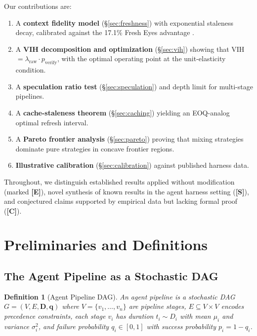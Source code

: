 \documentclass[11pt, a4paper, logo, copyright]{googledeepmind}
\newtheorem{definition}{Definition}[section]
\begin{document}
\noindent Our contributions are:

\begin{enumerate}
    \item A \textbf{context fidelity model} (\S\ref{sec:freshness}) with exponential staleness decay, calibrated against the 17.1\% Fresh Eyes advantage \citep{suzgun2024metaprompting}.
    \item A \textbf{VIH decomposition and optimization} (\S\ref{sec:vih}) showing that VIH $= \lambda_{\mathrm{raw}} \cdot p_{\mathrm{verify}}$, with the optimal operating point at the unit-elasticity condition.
    \item A \textbf{speculation ratio test} (\S\ref{sec:speculation}) and depth limit for multi-stage pipelines.
    \item A \textbf{cache-staleness theorem} (\S\ref{sec:caching}) yielding an EOQ-analog optimal refresh interval.
    \item A \textbf{Pareto frontier analysis} (\S\ref{sec:pareto}) proving that mixing strategies dominate pure strategies in concave frontier regions.
    \item \textbf{Illustrative calibration} (\S\ref{sec:calibration}) against published harness data.
\end{enumerate}

Throughout, we distinguish established results applied without modification (marked \textbf{[E]}), novel synthesis of known results in the agent harness setting (\textbf{[S]}), and conjectured claims supported by empirical data but lacking formal proof (\textbf{[C]}).


\section{Preliminaries and Definitions}\label{sec:prelim}

\subsection{The Agent Pipeline as a Stochastic DAG}

\begin{definition}[Agent Pipeline DAG]\label{def:pipeline}
An agent pipeline is a stochastic DAG $G = (V, E, \mathbf{D}, \mathbf{q})$ where $V = \{v_1, \ldots, v_n\}$ are pipeline stages, $E \subseteq V \times V$ encodes precedence constraints, each stage $v_i$ has duration $t_i \sim D_i$ with mean $\mu_i$ and variance $\sigma_i^2$, and failure probability $q_i \in [0,1]$ with success probability $p_i = 1 - q_i$.
\end{definition}
\end{document}

